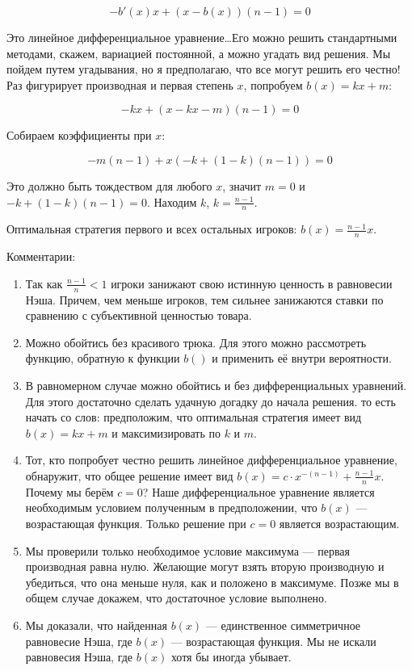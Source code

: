 \begin{enumerate}
\begin{equation}
-b'(x)x+(x-b(x))(n-1)=0
\end{equation}

Это линейное дифференциальное уравнение\ldots Его можно решить стандартными методами, скажем, вариацией постоянной, а можно угадать вид решения. Мы пойдем путем угадывания, но я предполагаю, что все могут решить его честно! Раз фигурирует производная и первая степень $ x $, попробуем $b(x)=kx+m $:

\begin{equation}
-kx+(x-kx-m)(n-1)=0
\end{equation}

Собираем коэффициенты при $ x $:

\begin{equation}
-m(n-1)+x(-k+(1-k)(n-1))=0
\end{equation}

Это должно быть тождеством для любого $ x $, значит $ m=0 $ и  $-k+(1-k)(n-1)=0$. Находим $ k $, $ k=\frac{n-1}{n} $.

Оптимальная стратегия первого и всех остальных игроков: $ b(x)=\frac{n-1}{n}x $.


Комментарии:

\begin{enumerate}
\item Так как $ \frac{n-1}{n}<1 $ игроки занижают свою истинную ценность в равновесии Нэша. Причем, чем меньше игроков, тем сильнее занижаются ставки по сравнению с субъективной ценностью товара.
\item Можно обойтись без красивого трюка. Для этого можно рассмотреть функцию, обратную к функции $ b() $ и применить её внутри вероятности.
\item В равномерном случае можно обойтись и без дифференциальных уравнений. Для этого достаточно сделать удачную догадку до начала решения. то есть начать со слов: предположим, что оптимальная стратегия имеет вид $ b(x)=kx+m $ и максимизировать по $ k $ и $ m $.
\item Тот, кто попробует честно решить линейное дифференциальное уравнение, обнаружит, что общее решение имеет вид $ b(x)=c\cdot x^{-(n-1)}+\frac{n-1}{n}x $. Почему мы берём $ c=0 $? Наше дифференциальное уравнение является необходимым условием полученным в предположении, что $ b(x) $ — возрастающая функция. Только решение при $ c=0 $ является возрастающим.
\item Мы проверили только необходимое условие максимума — первая производная равна нулю. Желающие могут взять вторую производную и убедиться, что она меньше нуля, как и положено в максимуме. Позже мы в общем случае докажем, что достаточное условие выполнено.
\item Мы доказали, что найденная $ b(x) $ — единственное симметричное равновесие Нэша, где $ b(x) $ — возрастающая функция. Мы не искали равновесия Нэша, где $ b(x) $ хотя бы иногда убывает.
\end{enumerate}



\end{enumerate}
